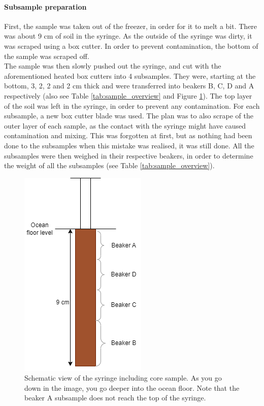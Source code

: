 \documentclass[twocolumn,a4paper,aps,amsmath,amssymb,floatfix,superscriptaddress]{revtex4-2}
\begin{document}
	\paragraph{Subsample preparation}
	First, the sample was taken out of the freezer, in order for it to melt a bit. There was about 9 cm of soil in the syringe. As the outside of the syringe was dirty, it was scraped using a box cutter. In order to prevent contamination, the bottom of the sample was scraped off. \\
	The sample was then slowly pushed out the syringe, and cut with the aforementioned heated box cutters into 4 subsamples. They were, starting at the bottom, 3, 2, 2 and 2 cm thick and were transferred into beakers B, C, D and A respectively (also see Table \ref{tab:sample_overview} and Figure \ref{fig:core-schematic}). The top layer of the soil was left in the syringe, in order to prevent any contamination. For each subsample, a new box cutter blade was used. The plan was to also scrape of the outer layer of each sample, as the contact with the syringe might have caused contamination and mixing. This was forgotten at first, but as nothing had been done to the subsamples when this mistake was realised, it was still done. All the subsamples were then weighed in their respective beakers, in order to determine the weight of all the subsamples (see Table \ref{tab:sample_overview}).\\
	\begin{figure}[t!]
		\centering
		\includegraphics[width=0.7\linewidth]{"Images/Core schematic"}
		\caption{Schematic view of the syringe including core sample. As you go down in the image, you go deeper into the ocean floor. Note that the beaker A subsample does not reach the top of the syringe.}
		\label{fig:core-schematic}
	\end{figure}
\end{document}
